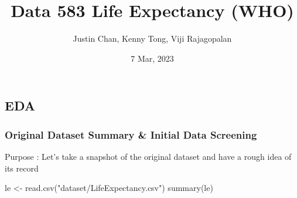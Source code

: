 \documentclass[
]{article}
\title{Data 583 Life Expectancy (WHO)}
\author{Justin Chan, Kenny Tong, Viji Rajagopalan}
\date{7 Mar, 2023}
\newenvironment{Shaded}{\begin{snugshade}}{\end{snugshade}}
\newcommand{\FunctionTok}[1]{\textcolor[rgb]{0.00,0.00,0.00}{#1}}
\newcommand{\NormalTok}[1]{#1}
\newcommand{\OtherTok}[1]{\textcolor[rgb]{0.56,0.35,0.01}{#1}}
\newcommand{\StringTok}[1]{\textcolor[rgb]{0.31,0.60,0.02}{#1}}
\begin{document}
\maketitle

\hypertarget{eda}{%
\subsection{EDA}\label{eda}}

\hypertarget{original-dataset-summary-initial-data-screening}{%
\subsubsection{Original Dataset Summary \& Initial Data
Screening}\label{original-dataset-summary-initial-data-screening}}

Purpose : Let's take a snapshot of the original dataset and have a rough
idea of its record

\begin{Shaded}
\begin{Highlighting}[]
\NormalTok{le }\OtherTok{\textless{}{-}} \FunctionTok{read.csv}\NormalTok{(}\StringTok{"dataset/LifeExpectancy.csv"}\NormalTok{)}
\FunctionTok{summary}\NormalTok{(le)}
\end{Highlighting}
\end{Shaded}
\end{document}
